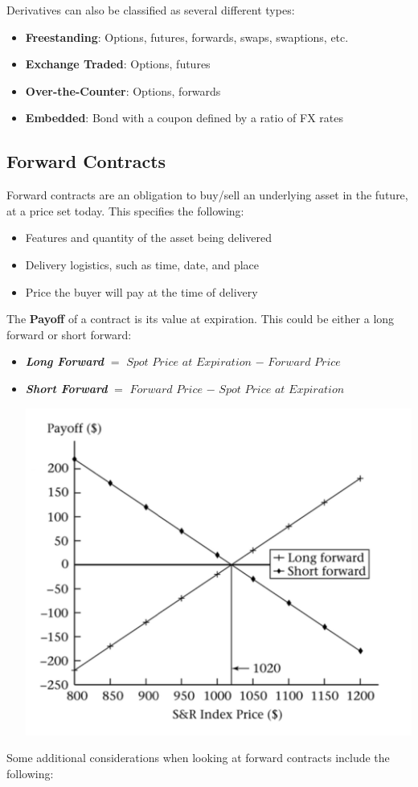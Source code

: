 \documentclass[11pt]{article}
\begin{document}
Derivatives can also be classified as several different types:
\begin{itemize}
\item \textbf{Freestanding}: Options, futures, forwards, swaps, swaptions, etc.
\item \textbf{Exchange Traded}: Options, futures
\item \textbf{Over-the-Counter}: Options, forwards
\item \textbf{Embedded}: Bond with a coupon defined by a ratio of FX rates
\end{itemize}


\subsection{Forward Contracts}
Forward contracts are an obligation to buy/sell an underlying asset in the future, at a price set today. This specifies the following:
\begin{itemize}
\item Features and quantity of the asset being delivered
\item Delivery logistics,  such as time, date, and place
\item Price the buyer will pay at the time of delivery
\end{itemize}
\pagebreak
The \textbf{Payoff} of a contract is its value at expiration. This could be either a long forward or short forward:
\begin{itemize}
\item \textbf{\textit{Long Forward}} $=$ $Spot$ $Price$ $at$ $Expiration$ $-$ $Forward$ $Price$
\item \textbf{\textit{Short Forward}} $=$ $Forward$ $Price$ $-$ $Spot$ $Price$ $at$ $Expiration$ 
\begin{center}
\includegraphics[scale=0.4]{images/forwards.png} 
\end{center}
\end{itemize}
Some additional considerations when looking at forward contracts include the following:
\end{document}
